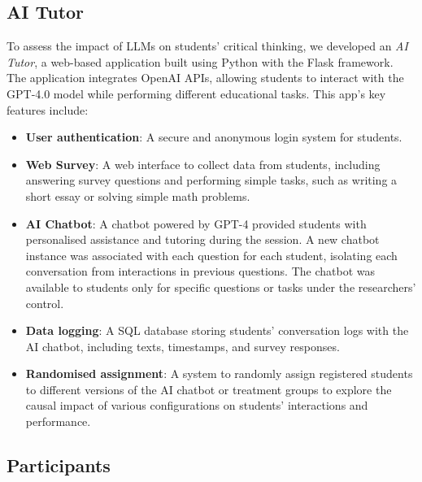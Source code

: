 \documentclass[
  12pt,
]{article}
\providecommand{\tightlist}{%
  \setlength{\itemsep}{0pt}\setlength{\parskip}{0pt}}
\begin{document}
\subsection{AI Tutor}\label{ai-tutor}

To assess the impact of LLMs on students' critical thinking, we developed an \emph{AI Tutor}, a web-based application built using Python with the Flask framework. The application integrates OpenAI APIs, allowing students to interact with the GPT-4.0 model while performing different educational tasks. This app's key features include:

\begin{itemize}
\tightlist
\item
  \textbf{User authentication}: A secure and anonymous login system for students.
\item
  \textbf{Web Survey}: A web interface to collect data from students, including answering survey questions and performing simple tasks, such as writing a short essay or solving simple math problems.
\item
  \textbf{AI Chatbot}: A chatbot powered by GPT-4 provided students with personalised assistance and tutoring during the session. A new chatbot instance was associated with each question for each student, isolating each conversation from interactions in previous questions. The chatbot was available to students only for specific questions or tasks under the researchers' control.
\item
  \textbf{Data logging}: A SQL database storing students' conversation logs with the AI chatbot, including texts, timestamps, and survey responses.
\item
  \textbf{Randomised assignment}: A system to randomly assign registered students to different versions of the AI chatbot or treatment groups to explore the causal impact of various configurations on students' interactions and performance.
\end{itemize}

\subsection{Participants}\label{participants}
\end{document}
